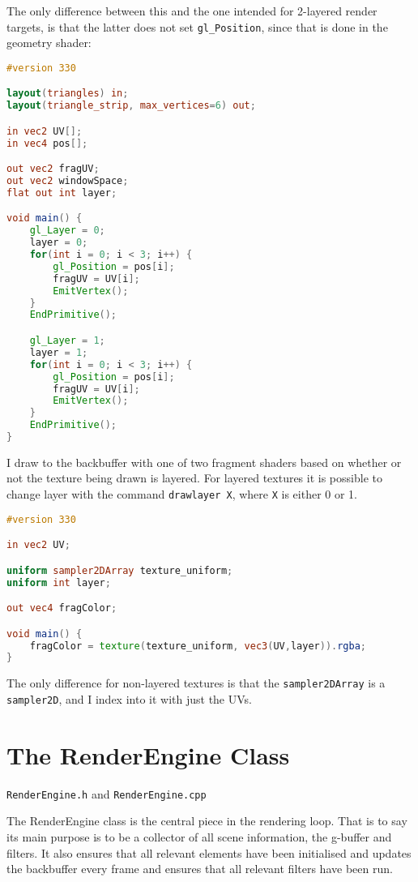 The only difference between this and the one intended for 2-layered render targets, is that the latter does not set \verb=gl_Position=, since that is done in the geometry shader:

\begin{lstlisting}[caption={layered\_quad.geom},language=GLSL]
#version 330

layout(triangles) in;
layout(triangle_strip, max_vertices=6) out;

in vec2 UV[];
in vec4 pos[];

out vec2 fragUV;
out vec2 windowSpace;
flat out int layer;

void main() {
    gl_Layer = 0;
    layer = 0;
    for(int i = 0; i < 3; i++) {
        gl_Position = pos[i];
        fragUV = UV[i];
        EmitVertex();
    }
    EndPrimitive();

    gl_Layer = 1;
    layer = 1;
    for(int i = 0; i < 3; i++) {
        gl_Position = pos[i];
        fragUV = UV[i];
        EmitVertex();
    }
    EndPrimitive();
}
\end{lstlisting}

I draw to the backbuffer with one of two fragment shaders based on whether or not the texture being drawn is layered. For layered textures it is possible to change layer with the command \verb=drawlayer X=, where \verb=X= is either 0 or 1.

\begin{lstlisting}[caption={layered\_texture.frag},language=GLSL]
#version 330

in vec2 UV;

uniform sampler2DArray texture_uniform;
uniform int layer;

out vec4 fragColor;

void main() {
    fragColor = texture(texture_uniform, vec3(UV,layer)).rgba;
}
\end{lstlisting}

The only difference for non-layered textures is that the \verb=sampler2DArray= is a \verb=sampler2D=, and I index into it with just the UVs.

\section{The RenderEngine Class}
\verb=RenderEngine.h= and \verb=RenderEngine.cpp=

The RenderEngine class is the central piece in the rendering loop. That is to say its main purpose is to be a collector of all scene information, the g-buffer and filters. It also ensures that all relevant elements have been initialised and updates the backbuffer every frame and ensures that all relevant filters have been run.

